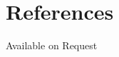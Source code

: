 \documentclass[11pt,a4paper,sans]{moderncv} %
\begin{document}
\vspace{5mm}
\begin{comment}
\begin{center}
\begin{tikzpicture}
\begin{scope}[curve in scope]
	\path (0,0) -- node[auto] { End CV. (Published work listed below)} (10,0);
\end{scope}
 \end{tikzpicture}
 \end{center}

\section{Publications}

\subsection{Published Papers (Accepted)}
\newbibliography{journal}
\nocite{journal}{*}
{plainyrrev}
{journal}
{\large \textsc{Refereed Journal Articles}}

\subsection{Standards and Industry Relevant Publications}
\newbibliography{conference}
\nocite{conference}{*}
{plainyrrev}
{conference}
{\large \textsc{Standards and Industry Relevant Publications}}

\subsection{Publications and Speeches as Subject Matter Expert}
\newbibliography{speeches}
\nocite{speeches}{*}
{plainyrrev}
{speeches}
{\large \textsc{Publications and Speeches as Subject Matter Expert}}

\end{comment}
\section{References}
Available on Request
\end{document}
